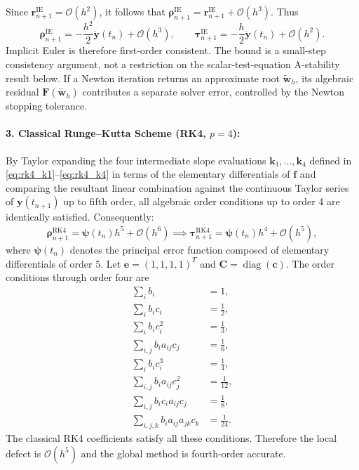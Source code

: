 Since $\mathbf r_{n+1}^{\mathrm{IE}}=\mathcal O(h^2)$, it follows that $\boldsymbol\rho_{n+1}^{\mathrm{IE}}=\mathbf r_{n+1}^{\mathrm{IE}}+\mathcal O(h^3)$. Thus
\begin{equation}
\label{eq:ie_defect_expansion}
\boldsymbol\rho_{n+1}^{\mathrm{IE}}
=-\frac{h^2}{2}\ddot{\mathbf y}(t_n)+\mathcal O(h^3),
\qquad
\boldsymbol\tau_{n+1}^{\mathrm{IE}}
=-\frac{h}{2}\ddot{\mathbf y}(t_n)+\mathcal O(h^2).
\end{equation}
Implicit Euler is therefore first-order consistent. The bound is a small-step consistency argument, not a restriction on the scalar-test-equation A-stability result below. If a Newton iteration returns an approximate root $\widetilde{\mathbf w}_h$, its algebraic residual $\mathbf F(\widetilde{\mathbf w}_h)$ contributes a separate solver error, controlled by the Newton stopping tolerance.

\paragraph{3. Classical Runge--Kutta Scheme (RK4, $p=4$):}
By Taylor expanding the four intermediate slope evaluations $\mathbf{k}_1, \dots, \mathbf{k}_4$ defined in \eqref{eq:rk4_k1}--\eqref{eq:rk4_k4} in terms of the elementary differentials of $\mathbf{f}$ and comparing the resultant linear combination against the continuous Taylor series of $\mathbf{y}(t_{n+1})$ up to fifth order, all algebraic order conditions up to order 4 are identically satisfied. Consequently:
\begin{equation}
\label{eq:rk4_defect}
\boldsymbol{\rho}_{n+1}^{\text{RK4}} = \boldsymbol{\psi}(t_n) h^5 + \mathcal{O}(h^6) \implies \boldsymbol{\tau}_{n+1}^{\text{RK4}} = \boldsymbol{\psi}(t_n) h^4 + \mathcal{O}(h^5),
\end{equation}
where $\boldsymbol{\psi}(t_n)$ denotes the principal error function composed of elementary differentials of order 5. Let $\mathbf{e}=(1,1,1,1)^T$ and $\mathbf{C}=\operatorname{diag}(\mathbf{c})$. The order conditions through order four are
\begin{align}
\sum_i b_i &= 1, \\
\sum_i b_i c_i &= \frac12, \\
\sum_i b_i c_i^2 &= \frac13, \\
\sum_{i,j} b_i a_{ij}c_j &= \frac16, \\
\sum_i b_i c_i^3 &= \frac14, \\
\sum_{i,j} b_i a_{ij}c_j^2 &= \frac1{12}, \\
\sum_{i,j} b_i c_i a_{ij}c_j &= \frac18, \\
\sum_{i,j,k} b_i a_{ij}a_{jk}c_k &= \frac1{24}.
\end{align}
The classical RK4 coefficients satisfy all these conditions. Therefore the local defect is $\mathcal{O}(h^5)$ and the global method is fourth-order accurate.

